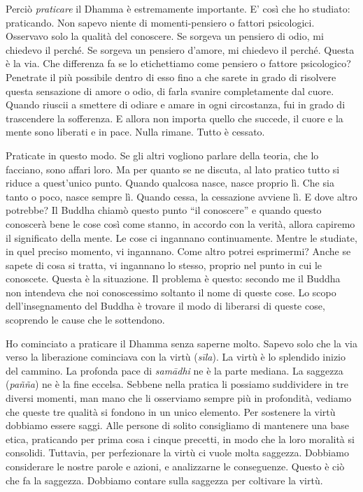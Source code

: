 Perciò \emph{praticare} il Dhamma è estremamente importante. E' così che
ho studiato: praticando. Non sapevo niente di momenti-pensiero o fattori
psicologici. Osservavo solo la qualità del conoscere. Se sorgeva un
pensiero di odio, mi chiedevo il perché. Se sorgeva un pensiero d'amore,
mi chiedevo il perché. Questa è la via. Che differenza fa se lo
etichettiamo come pensiero o fattore psicologico? Penetrate il più
possibile dentro di esso fino a che sarete in grado di risolvere questa
sensazione di amore o odio, di farla svanire completamente dal cuore.
Quando riuscii a smettere di odiare e amare in ogni circostanza, fui in
grado di trascendere la sofferenza. E allora non importa quello che
succede, il cuore e la mente sono liberati e in pace. Nulla rimane.
Tutto è cessato.

Praticate in questo modo. Se gli altri vogliono parlare della teoria,
che lo facciano, sono affari loro. Ma per quanto se ne discuta, al lato
pratico tutto si riduce a quest'unico punto. Quando qualcosa nasce,
nasce proprio lì. Che sia tanto o poco, nasce sempre lì. Quando cessa,
la cessazione avviene lì. E dove altro potrebbe? Il Buddha chiamò questo
punto ``il conoscere'' e quando questo conoscerà bene le cose così come
stanno, in accordo con la verità, allora capiremo il significato della
mente. Le cose ci ingannano continuamente. Mentre le studiate, in quel
preciso momento, vi ingannano. Come altro potrei esprimermi? Anche se
sapete di cosa si tratta, vi ingannano lo stesso, proprio nel punto in
cui le conoscete. Questa è la situazione. Il problema è questo: secondo
me il Buddha non intendeva che noi conoscessimo soltanto il nome di
queste cose. Lo scopo dell'insegnamento del Buddha è trovare il modo di
liberarsi di queste cose, scoprendo le cause che le sottendono.


Ho cominciato a praticare il Dhamma senza saperne molto. Sapevo solo che
la via verso la liberazione cominciava con la virtù (\emph{sīla}).
La virtù è lo splendido inizio del cammino. La profonda pace di
\emph{samādhi} ne è la parte mediana. La saggezza
(\emph{pañña}) ne è la fine eccelsa. Sebbene nella pratica li possiamo
suddividere in tre diversi momenti, man mano che li osserviamo sempre
più in profondità, vediamo che queste tre qualità si fondono in un unico
elemento. Per sostenere la virtù dobbiamo essere saggi. Alle persone di
solito consigliamo di mantenere una base etica, praticando per prima
cosa i cinque precetti, in modo che la loro moralità si consolidi.
Tuttavia, per perfezionare la virtù ci vuole molta saggezza. Dobbiamo
considerare le nostre parole e azioni, e analizzarne le conseguenze.
Questo è ciò che fa la saggezza. Dobbiamo contare sulla saggezza per
coltivare la virtù.

